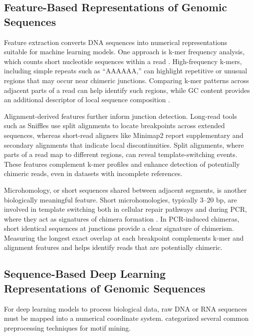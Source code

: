 \subsection{Feature-Based Representations of Genomic Sequences}

Feature extraction converts DNA sequences into numerical representations suitable for machine learning models. One approach is k-mer frequency analysis, which counts short nucleotide sequences within a read \citep{Vervier2015}. High-frequency k-mers, including simple repeats such as “AAAAAA,” can highlight repetitive or unusual regions that may occur near chimeric junctions. Comparing k-mer patterns across adjacent parts of a read can help identify such regions, while GC content provides an additional descriptor of local sequence composition \citep{Ren2020}.

Alignment-derived features further inform junction detection. Long-read tools such as Sniffles \citep{Sedlazeck2018} use split alignments to locate breakpoints across extended sequences, whereas short-read aligners like Minimap2 \citep{Li2018} report supplementary and secondary alignments that indicate local discontinuities. Split alignments, where parts of a read map to different regions, can reveal template-switching events. These features complement k-mer profiles and enhance detection of potentially chimeric reads, even in datasets with incomplete references.

Microhomology, or short sequences shared between adjacent segments, is another biologically meaningful feature. Short microhomologies, typically 3--20 bp, are involved in template switching both in cellular repair pathways and during PCR, where they act as signatures of chimera formation \citep{Sfeir2015,Peccoud2018}. In PCR-induced chimeras, short identical sequences at junctions provide a clear signature of chimerism. Measuring the longest exact overlap at each breakpoint complements k-mer and alignment features and helps identify reads that are potentially chimeric.

\subsection{Sequence-Based Deep Learning Representations of Genomic Sequences}

For deep learning models to process biological data, raw DNA or RNA sequences must be mapped into a numerical coordinate system. \citet{He2021} categorized several common preprocessing techniques for motif mining.

